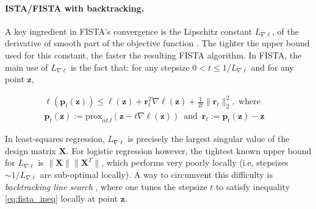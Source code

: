 \paragraph{ISTA/FISTA with backtracking.}
A key ingredient in FISTA's convergence is the Lipschitz
constant $L_{\nabla \ell}$, of the derivative of smooth part of the objective function
. The tighter the upper bound used for this constant,
the faster the resulting FISTA algorithm. In FISTA, the main use of 
$L_{\nabla \ell}$ is the fact that: for any
stepsize $0 < t \le 1/L_{\nabla \ell}$ and for any point $\mathbf{z}$,
\begin{shaded}
\begin{equation}%
  \begin{gathered}
    \ell(\mathbf{p}_{t}(\mathbf{z})) \le
    \ell(\mathbf{z}) + \mathbf{r}_{t}^T\nabla
    \ell(\mathbf{z}) + \frac{1}{2t} \|\mathbf{r}_{t}\|_{2}^2,
    \text{  where} \quad\\
    \mathbf{p}_{t}(\mathbf{z}) := \textrm{prox}_{\alpha t J}(\mathbf{z} - t
    \nabla \ell(\mathbf{z})) \,\text{  and  }\,
    \mathbf{r}_{t} :=
    \mathbf{p}_{t}(\mathbf{z}) - \mathbf{z} \quad
  \end{gathered}
  \label{eq:fista_ineq}
\end{equation}
\end{shaded}
In least-squares regression, $L_{\nabla \ell}$ is precisely the largest
singular value of the design matrix $\mathbf{X}$.
For logistic
regression however, the tightest known upper bound for
$L_{\nabla \ell}$ is $\|\mathbf{X}\|\|\mathbf{X}^T\|$,
which performs very poorly locally (i.e, stepsizes $\sim 1 / L_{\nabla \ell}$ are
sub-optimal locally). A way to circumvent this difficulty is
\emph{backtracking line search}  \citep{beck2009a}, where one tunes the
stepsize $t$ to satisfy inequality \eqref{eq:fista_ineq} locally at
point $\mathbf{z}$. 


